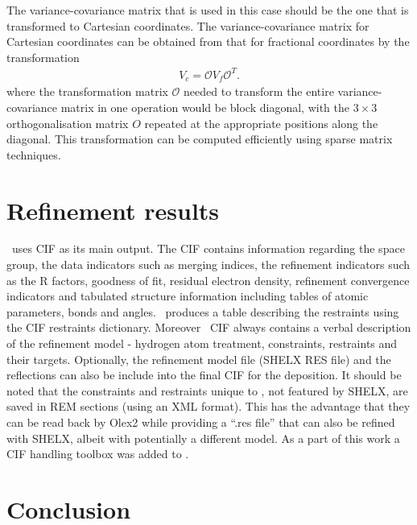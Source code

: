 \documentclass[11pt]{article}
\newcommand{\mat}[1]{#1}
\begin{document}
The variance-covariance matrix that is used in this case should be the one that is transformed to Cartesian coordinates. The variance-covariance matrix for Cartesian coordinates can be obtained from that for fractional coordinates by the transformation
\begin{align}
\mat{V}_{c} = \mat{\mathcal{O}} \mat{V}_{f} \mat{\mathcal{O}}^{T}.
\label{eqn:vcv_cart}
\end{align}
where the transformation matrix $\mathcal{O}$ needed to transform the entire variance-covariance matrix in one operation would be block diagonal, with the $3 \times 3$ orthogonalisation matrix $O$ repeated at the appropriate positions along the diagonal. This transformation can be computed efficiently using sparse matrix techniques.

\section{Refinement results}
\label{sec:refinement:results}

\olexrefine\ uses CIF \cite{Hall:1991aa} as its main output. The CIF contains information regarding the space group, the data indicators such as merging indices, the refinement indicators such as the R factors, goodness of fit, residual electron density, refinement convergence indicators and tabulated structure information including tables of atomic parameters, bonds and angles. \olexrefine\ produces a table describing the restraints using the CIF restraints dictionary. Moreover \olexrefine\ CIF always contains a verbal description of the refinement model - hydrogen atom treatment, constraints, restraints and their targets. Optionally, the refinement model file (SHELX RES file) and the reflections can also be include into the final CIF for the deposition. It should be noted that the constraints and restraints unique to \olexrefine,  not featured by SHELX, are saved in REM sections (using an XML format). This has the advantage that they can be read back by Olex2 while providing a ``.res file'' that can also be refined with SHELX, albeit with potentially a different model. As a part of this work a CIF handling toolbox \cite{Gildea:2011aa} was added to \cctbx.

\section{Conclusion}
\end{document}
